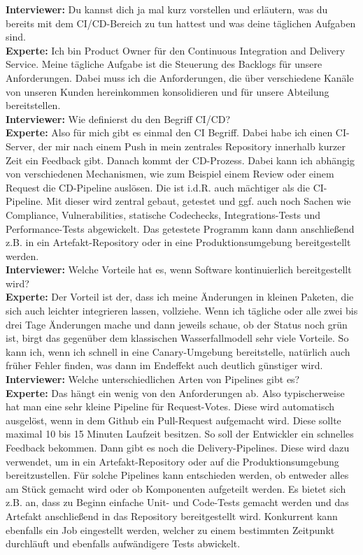 \begin{linenumbers}
\textbf{Interviewer:} Du kannst dich ja mal kurz vorstellen und erläutern, was du bereits mit dem CI/CD-Bereich zu tun hattest und was deine täglichen Aufgaben sind.\\
\textbf{Experte:} Ich bin Product Owner für den Continuous Integration and Delivery Service. Meine tägliche Aufgabe ist die Steuerung des Backlogs für unsere Anforderungen. Dabei muss ich die Anforderungen, die über verschiedene Kanäle von unseren Kunden hereinkommen konsolidieren und für unsere Abteilung bereitstellen.\\
\textbf{Interviewer:} Wie definierst du den Begriff CI/CD?\\
\textbf{Experte:} Also für mich gibt es einmal den CI Begriff. Dabei habe ich einen CI-Server, der mir nach einem Push in mein zentrales Repository innerhalb kurzer Zeit ein Feedback gibt. Danach kommt der CD-Prozess. Dabei kann ich abhängig von verschiedenen Mechanismen, wie zum Beispiel einem Review oder einem Request die CD-Pipeline auslösen. Die ist i.d.R. auch mächtiger als die CI-Pipeline. Mit dieser wird zentral gebaut, getestet und ggf. auch noch Sachen wie Compliance, Vulnerabilities, statische Codechecks, Integrations-Tests und Performance-Tests abgewickelt. Das getestete Programm kann dann anschließend z.B. in ein Artefakt-Repository oder in eine Produktionsumgebung bereitgestellt werden.\\
\textbf{Interviewer:} Welche Vorteile hat es, wenn Software kontinuierlich bereitgestellt wird?\\
\textbf{Experte:} Der Vorteil ist der, dass ich meine Änderungen in kleinen Paketen, die sich auch leichter integrieren lassen, vollziehe. Wenn ich tägliche oder alle zwei bis drei Tage Änderungen mache und dann jeweils schaue, ob der Status noch grün ist, birgt das gegenüber dem klassischen Wasserfallmodell sehr viele Vorteile. So kann ich, wenn ich schnell in eine Canary-Umgebung bereitstelle, natürlich auch früher Fehler finden, was dann im Endeffekt auch deutlich günstiger wird.\\
\textbf{Interviewer:} Welche unterschiedlichen Arten von Pipelines gibt es?\\
\textbf{Experte:} Das hängt ein wenig von den Anforderungen ab. Also typischerweise hat man eine sehr kleine Pipeline für Request-Votes. Diese wird automatisch ausgelöst, wenn in dem Github ein Pull-Request aufgemacht wird. Diese sollte maximal 10 bis 15 Minuten Laufzeit besitzen. So soll der Entwickler ein schnelles Feedback bekommen. Dann gibt es noch die Delivery-Pipelines. Diese wird dazu verwendet, um in ein Artefakt-Repository oder auf die Produktionsumgebung bereitzustellen. Für solche Pipelines kann entschieden werden, ob entweder alles am Stück gemacht wird oder ob Komponenten aufgeteilt werden. Es bietet sich z.B. an, dass zu Beginn einfache Unit- und Code-Tests gemacht werden und das Artefakt anschließend in das Repository bereitgestellt wird. Konkurrent kann ebenfalls ein Job eingestellt werden, welcher zu einem bestimmten Zeitpunkt durchläuft und ebenfalls aufwändigere Tests abwickelt.\\

\end{linenumbers}

